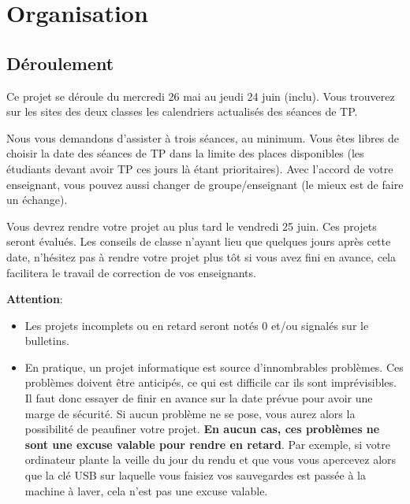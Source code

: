 \section{Organisation}

\subsection{Déroulement}

Ce projet se déroule du mercredi 26 mai au jeudi 24 juin (inclu). Vous trouverez sur les sites des deux 
classes les calendriers actualisés des séances de TP. 


Nous vous demandons d'assister à trois séances, au minimum. 
Vous êtes libres de choisir la date des séances de TP dans la limite des places disponibles (les étudiants devant avoir TP ces jours là étant prioritaires). 
Avec l'accord de votre enseignant, vous pouvez aussi changer de groupe/enseignant (le mieux est de faire un échange). 

Vous devrez rendre votre projet au plus tard le vendredi 25 juin. Ces projets seront évalués. Les conseils de 
classe n'ayant lieu que quelques jours après cette date, n'hésitez pas à rendre votre projet plus tôt si vous avez 
fini en avance, cela facilitera le travail de correction de vos enseignants.


\textbf{Attention}:
\begin{itemize}
\item Les projets incomplets ou en retard seront notés $0$ et/ou signalés sur le bulletins.
\item En  pratique, un  projet informatique est source d'innombrables
  problèmes.   Ces  problèmes  doivent  être  anticipés,  ce  qui  est
  difficile car ils sont imprévisibles.  Il faut donc essayer de finir
  en avance sur  la date prévue pour avoir une  marge de sécurité.  Si
  aucun  problème ne  se  pose,  vous aurez  alors  la possibilité  de
  peaufiner votre  projet.  \textbf{En  aucun cas, ces  problèmes ne  sont une
  excuse  valable  pour  rendre  en retard}.   Par  exemple,  si  votre
  ordinateur  plante la  veille  du jour  du rendu  et  que vous  vous
  apercevez  alors  que la  clé  USB  sur  laquelle vous  faisiez  vos
  sauvegardes est  passée à  la machine  à laver,  cela n'est  pas une
  excuse valable.
\end{itemize}

